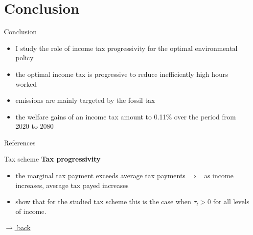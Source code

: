 \documentclass[11pt,aspectratio=169]{beamer}
\newcommand{\ar}{$\Rightarrow$ \ }
\begin{document}
\section*{Conclusion}
\begin{frame}{Conclusion}
	\begin{itemize}[<+-| alert@+>]
	\item I study the role of income tax progressivity for the optimal environmental policy %
	\vspace{3mm}
	\item the optimal income tax is progressive to reduce inefficiently high
	hours worked
	\vspace{3mm}
	\item emissions are mainly targeted by the fossil tax
		\vspace{3mm}
	\item the welfare gains of an income tax amount to 0.11\%  over the period from 2020 to 2080 %
   \vspace{3mm}
\end{itemize}
\end{frame}
\begin{frame}[shrink]{References}
	
	
	
\end{frame}



\appendix

\begin{frame}{Tax scheme}
	\hypertarget{taxsc}{}
\textbf{Tax progressivity}
\begin{itemize}
	\item the marginal tax payment exceeds average tax payments \ar as income increases, average tax payed increases
	\item \cite{Heathcote2017OptimalFramework} show that for the studied tax scheme this is the case when $\tau_l>0$ for all levels of income. 
\end{itemize}

\vspace{0mm}
\hfill
\hyperlink{backhh}{\tiny{$\rightarrow$ back}}
\end{frame}
\end{document}
